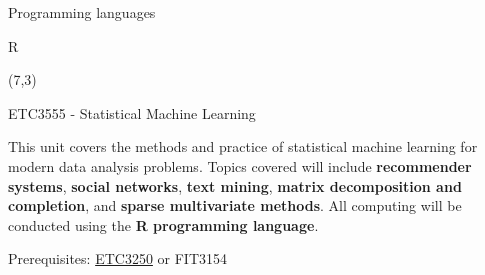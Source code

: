 \documentclass[14pt]{beamer}
\begin{document}
\begin{frame}{Programming languages}






\end{frame}

\begin{frame}{R}
 


\begin{textblock}{5.5}(7,3)\centerline{}\end{textblock}
\end{frame}

\begin{frame}{ {\normalsize ETC3555} {\large - Statistical Machine Learning} }

\begin{displayquote}
This unit covers the methods and practice of statistical machine learning for modern data analysis problems. Topics covered will include \textbf{recommender systems}, \textbf{social networks}, \textbf{text mining}, \textbf{matrix decomposition and completion}, and \textbf{sparse multivariate methods}. All computing will be conducted using the \textbf{R programming language}.
\end{displayquote}

\vspace{.5cm}

Prerequisites: \underline{ETC3250} or FIT3154

\end{frame}
\end{document}
